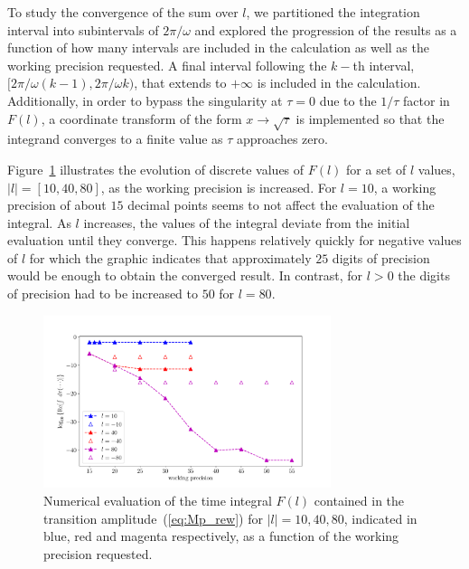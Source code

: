 To study the convergence of the sum over $l$, we partitioned the
integration interval into subintervals of $2\pi/\omega$ and explored
the progression of the results as a function of how many intervals are
included in the calculation as well as the working precision
requested. A final interval following the $k-$th interval,
$[2\pi/\omega (k-1), 2\pi/\omega k)$, that extends to $+\infty$ is
  included in the calculation. Additionally, in order to bypass the
  singularity at $\tau = 0$ due to the $1/\tau$ factor in $F(l)$, a
  coordinate transform of the form $x \to \sqrt{\tau}$ is implemented
  so that the integrand converges to a finite value as $\tau$
  approaches zero. %



Figure~\ref{fig:WP_convergence} illustrates the evolution of discrete
values of $F(l)$ for a set of $l$ values, $|l| = [10, 40, 80]$, as the
working precision is increased. For $l=10$, a working precision of
about $15$ decimal points seems to not affect the evaluation of the
integral. As $l$ increases, the values of the integral deviate from
the initial evaluation until they converge. This happens relatively
quickly for negative values of $l$ for which the graphic indicates
that approximately $25$ digits of precision would be enough to obtain
the converged result. In contrast, for $l>0$ the digits of precision
had to be increased to $50$ for $l = 80$.

\begin{figure}
  \centering
  \includegraphics[width=0.75\textwidth]{figures/ch_ATI_SFA/He/n512PG25MR35l_pm104080logRe}
  \caption{Numerical evaluation of the time integral $F(l)$ contained
    in the transition amplitude~(\ref{eq:Mp_rew}) for $|l| = 10, 40,
    80$, indicated in blue, red and magenta respectively, as a
    function of the working precision requested.}
  \label{fig:WP_convergence}
\end{figure}



